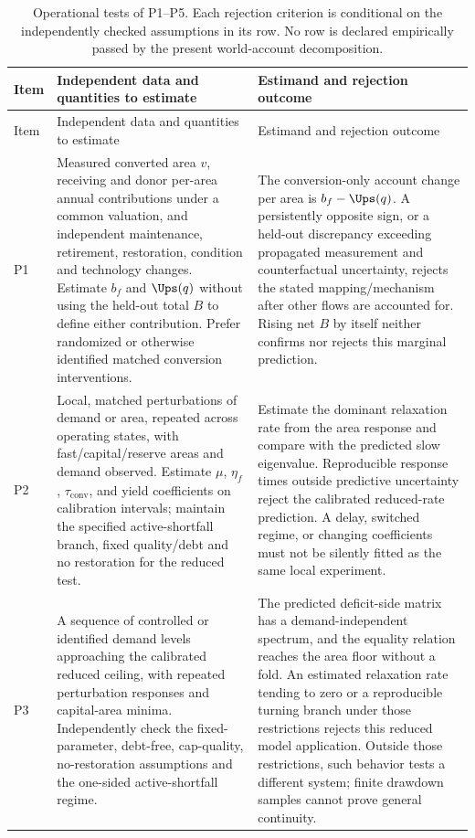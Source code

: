\begin{longtable}{>{\raggedright\arraybackslash}p{}>{\raggedright\arraybackslash}p{}>{\raggedright\arraybackslash}p{}}
\caption{Operational tests of P1--P5. Each rejection criterion is conditional on the independently checked assumptions in its row. No row is declared empirically passed by the present world-account decomposition.}\label{tab:si_predictionmap}\\
\toprule
Item & Independent data and quantities to estimate & Estimand and rejection outcome \\
\midrule
\endfirsthead
\toprule Item & Independent data and quantities to estimate & Estimand and rejection outcome \\
\midrule
\endhead
P1 & Measured converted area $v$, receiving and donor per-area annual contributions under a common valuation, and independent maintenance, retirement, restoration, condition and technology changes. Estimate $b_f$ and $\Ups(q)$ without using the held-out total $B$ to define either contribution. Prefer randomized or otherwise identified matched conversion interventions. & The conversion-only account change per area is $b_f-\Ups(q)$. A persistently opposite sign, or a held-out discrepancy exceeding propagated measurement and counterfactual uncertainty, rejects the stated mapping/mechanism after other flows are accounted for. Rising net $B$ by itself neither confirms nor rejects this marginal prediction. \\
\addlinespace
P2 & Local, matched perturbations of demand or area, repeated across operating states, with fast/capital/reserve areas and demand observed. Estimate $\mu$, $\eta_f$, $\tau_{\mathrm{conv}}$, and yield coefficients on calibration intervals; maintain the specified active-shortfall branch, fixed quality/debt and no restoration for the reduced test. & Estimate the dominant relaxation rate from the area response and compare with the predicted slow eigenvalue. Reproducible response times outside predictive uncertainty reject the calibrated reduced-rate prediction. A delay, switched regime, or changing coefficients must not be silently fitted as the same local experiment. \\
\addlinespace
P3 & A sequence of controlled or identified demand levels approaching the calibrated reduced ceiling, with repeated perturbation responses and capital-area minima. Independently check the fixed-parameter, debt-free, cap-quality, no-restoration assumptions and the one-sided active-shortfall regime. & The predicted deficit-side matrix has a demand-independent spectrum, and the equality relation reaches the area floor without a fold. An estimated relaxation rate tending to zero or a reproducible turning branch under those restrictions rejects this reduced model application. Outside those restrictions, such behavior tests a different system; finite drawdown samples cannot prove general continuity. \\

\end{longtable}
